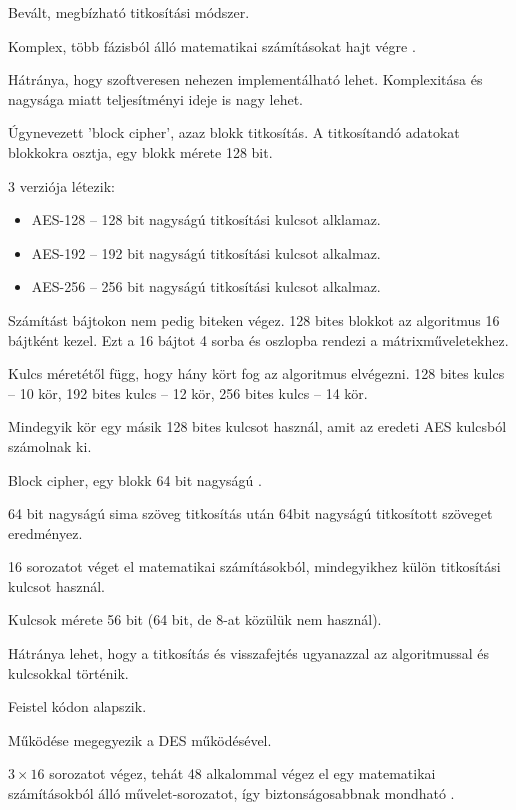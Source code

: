 \noindent Bevált, megbízható titkosítási módszer. 

Komplex, több fázisból álló matematikai számításokat hajt végre \cite{nechvatal2001report}.

Hátránya, hogy szoftveresen nehezen implementálható lehet. Komplexitása és nagysága miatt teljesítményi ideje is nagy lehet.

Úgynevezett 'block cipher', azaz blokk titkosítás. A titkosítandó adatokat blokkokra osztja, egy blokk mérete 128 bit.

3 verziója létezik:
\begin{itemize}
	\item AES-128 – 128 bit nagyságú titkosítási kulcsot alklamaz.
	\item AES-192 – 192 bit nagyságú titkosítási kulcsot alkalmaz.
	\item AES-256 – 256 bit nagyságú titkosítási kulcsot alkalmaz.
\end{itemize}

Számítást bájtokon nem pedig biteken végez. 128 bites blokkot az algoritmus 16 bájtként kezel. Ezt a 16 bájtot 4 sorba és oszlopba rendezi a mátrixműveletekhez.

Kulcs méretétől függ, hogy hány kört fog az algoritmus elvégezni. 128 bites kulcs – 10 kör, 192 bites kulcs – 12 kör, 256 bites kulcs – 14 kör.

Mindegyik kör egy másik 128 bites kulcsot használ, amit az eredeti AES kulcsból számolnak ki.



\noindent Block cipher, egy blokk 64 bit nagyságú \cite{standard1999data}.

64 bit nagyságú sima szöveg titkosítás után 64bit nagyságú titkosított szöveget eredményez.

16 sorozatot véget el matematikai számításokból, mindegyikhez külön titkosítási kulcsot használ.

Kulcsok mérete 56 bit (64 bit, de 8-at közülük nem használ).

Hátránya lehet, hogy a titkosítás és visszafejtés ugyanazzal az algoritmussal és kulcsokkal történik.

Feistel kódon alapszik.



\noindent Működése megegyezik a DES működésével.

$3 \times 16$ sorozatot végez, tehát 48 alkalommal végez el egy matematikai számításokból álló művelet-sorozatot, így biztonságosabbnak mondható \cite{enwiki:1078804116}.

